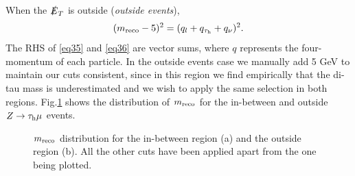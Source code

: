 When the $\slashed{E}_T$ is outside (\textit{outside events}),
\begin{equation}
	(m_{\text{reco}}-5)^{2}=(q_l+q_{\tau_\text{h}}+q_\nu)^2.
	\label{eq36}
\end{equation}
The RHS of \eqref{eq35} and \eqref{eq36} are vector sums, where $q$ represents the four-momentum of each particle. In the outside events case we manually add 5 GeV to maintain our cuts consistent, since in this region we find empirically that the di-tau mass is underestimated and we wish to apply the same selection in both regions. Fig.\ref{Fig10} shows the distribution of $m_{\text{reco}}$ for the in-between and outside $Z\to\tau_\text{h}\mu$ events. 
\begin{figure}[ht]
	\centering
	\hfill
	\caption{$m_{\text{reco}}$ distribution for the in-between region (a) and the outside region (b). All the other cuts have been applied apart from the one being plotted.}
	\label{Fig10}
\end{figure}

